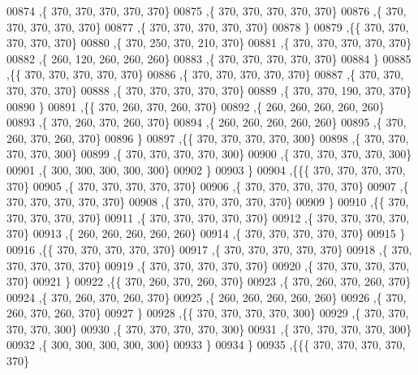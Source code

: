 \begin{DoxyCode}
00874    ,\{   370,   370,   370,   370,   370\}
00875    ,\{   370,   370,   370,   370,   370\}
00876    ,\{   370,   370,   370,   370,   370\}
00877    ,\{   370,   370,   370,   370,   370\}
00878    \}
00879   ,\{\{   370,   370,   370,   370,   370\}
00880    ,\{   370,   250,   370,   210,   370\}
00881    ,\{   370,   370,   370,   370,   370\}
00882    ,\{   260,   120,   260,   260,   260\}
00883    ,\{   370,   370,   370,   370,   370\}
00884    \}
00885   ,\{\{   370,   370,   370,   370,   370\}
00886    ,\{   370,   370,   370,   370,   370\}
00887    ,\{   370,   370,   370,   370,   370\}
00888    ,\{   370,   370,   370,   370,   370\}
00889    ,\{   370,   370,   190,   370,   370\}
00890    \}
00891   ,\{\{   370,   260,   370,   260,   370\}
00892    ,\{   260,   260,   260,   260,   260\}
00893    ,\{   370,   260,   370,   260,   370\}
00894    ,\{   260,   260,   260,   260,   260\}
00895    ,\{   370,   260,   370,   260,   370\}
00896    \}
00897   ,\{\{   370,   370,   370,   370,   300\}
00898    ,\{   370,   370,   370,   370,   300\}
00899    ,\{   370,   370,   370,   370,   300\}
00900    ,\{   370,   370,   370,   370,   300\}
00901    ,\{   300,   300,   300,   300,   300\}
00902    \}
00903   \}
00904  ,\{\{\{   370,   370,   370,   370,   370\}
00905    ,\{   370,   370,   370,   370,   370\}
00906    ,\{   370,   370,   370,   370,   370\}
00907    ,\{   370,   370,   370,   370,   370\}
00908    ,\{   370,   370,   370,   370,   370\}
00909    \}
00910   ,\{\{   370,   370,   370,   370,   370\}
00911    ,\{   370,   370,   370,   370,   370\}
00912    ,\{   370,   370,   370,   370,   370\}
00913    ,\{   260,   260,   260,   260,   260\}
00914    ,\{   370,   370,   370,   370,   370\}
00915    \}
00916   ,\{\{   370,   370,   370,   370,   370\}
00917    ,\{   370,   370,   370,   370,   370\}
00918    ,\{   370,   370,   370,   370,   370\}
00919    ,\{   370,   370,   370,   370,   370\}
00920    ,\{   370,   370,   370,   370,   370\}
00921    \}
00922   ,\{\{   370,   260,   370,   260,   370\}
00923    ,\{   370,   260,   370,   260,   370\}
00924    ,\{   370,   260,   370,   260,   370\}
00925    ,\{   260,   260,   260,   260,   260\}
00926    ,\{   370,   260,   370,   260,   370\}
00927    \}
00928   ,\{\{   370,   370,   370,   370,   300\}
00929    ,\{   370,   370,   370,   370,   300\}
00930    ,\{   370,   370,   370,   370,   300\}
00931    ,\{   370,   370,   370,   370,   300\}
00932    ,\{   300,   300,   300,   300,   300\}
00933    \}
00934   \}
00935  ,\{\{\{   370,   370,   370,   370,   370\}

\end{DoxyCode}
